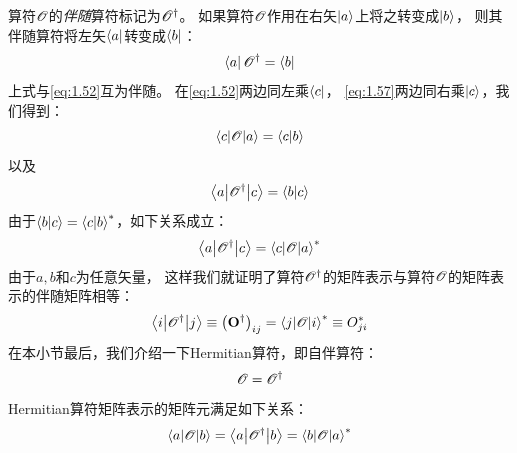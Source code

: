 算符$\mathscr{O}$的\emph{伴随}算符标记为$\mathscr O^\dagger$。
如果算符$\mathscr{O}$作用在右矢$\Ket{a}$上将之转变成$\Ket{b}$，
则其伴随算符将左矢$\Bra{a}$转变成$\Bra{b}$：
\begin{equation}
 \Bra{a}\mathscr O^\dagger = \Bra{b}
 \label{eq:1.57}
\end{equation}
上式与\autoref{eq:1.52}互为伴随。
在\autoref{eq:1.52}两边同左乘$\Bra{c}$，
\autoref{eq:1.57}两边同右乘$\Ket{c}$，我们得到：
\[
\left\langle c\middle\vert \mathscr{O} \middle\vert a\right\rangle = \langle c \vert b \rangle
\]
以及
\[
\left\langle a\middle\vert \mathscr O^\dagger\middle\vert c\right\rangle = \langle b \vert c \rangle
\]
由于$\langle b \vert c \rangle = {\langle c \vert b \rangle}^\ast$，如下关系成立：
\begin{equation}
 \left\langle a\middle\vert \mathscr O^\dagger\middle\vert c\right\rangle = {\left\langle c\middle\vert \mathscr{O} \middle\vert a\right\rangle}^\ast
 \label{eq:1.58}
\end{equation}
由于$a, b$和$c$为任意矢量，
这样我们就证明了算符$\mathscr O^\dagger$的矩阵表示与算符$\mathscr{O}$的矩阵表示的伴随矩阵相等：
\begin{equation}
 \left\langle i\middle\vert \mathscr O^\dagger\middle\vert j\right\rangle \equiv \left(\mathbf{O}^\dagger\right)_{ij} = {\left\langle j\middle\vert \mathscr{O} \middle\vert i\right\rangle}^\ast \equiv O_{ji}^\ast
 \label{eq:1.59}
\end{equation}
在本小节最后，我们介绍一下Hermitian算符，即自伴算符：
\begin{equation}
 \mathscr{O} = \mathscr O^\dagger
 \label{eq:1.60}
\end{equation}
Hermitian算符矩阵表示的矩阵元满足如下关系：
\begin{equation}
 \left\langle a\middle\vert \mathscr{O} \middle\vert b\right\rangle = \left\langle a\middle\vert \mathscr O^\dagger\middle\vert b\right\rangle = {\left\langle b\middle\vert \mathscr{O} \middle\vert a\right\rangle}^\ast
 \label{eq:1.61}
\end{equation}


